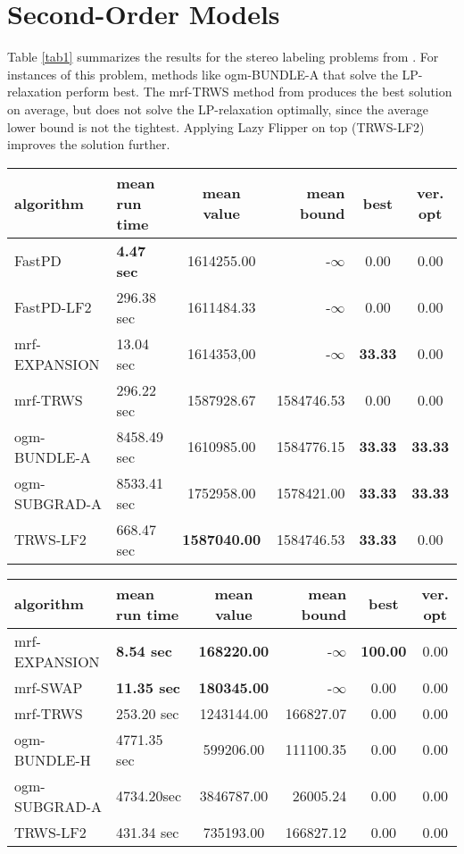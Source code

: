 \documentclass[10pt,twocolumn,letterpaper]{article}
\begin{document}
\section{Second-Order Models}

Table \ref{tab1} summarizes the results for the stereo labeling problems from \cite{comparative}. For instances of this problem, methods like ogm-BUNDLE-A that solve the LP-relaxation perform best. The mrf-TRWS method from \cite{comparative} produces the best solution on average, but does not solve the LP-relaxation optimally, since the average lower bound is not the tightest. Applying Lazy Flipper on top (TRWS-LF2) improves the solution further.

\begin{table*}
\begin{center}
\begin{tabular}{p{3.5cm}p{3cm}crcc}
 \hline
 algorithm & mean run time & mean value & mean bound & best & ver. opt \\ 
 \hline
 FastPD & {\bf 4.47 sec} & 1614255.00 & -$\infty$ & 0.00 & 0.00 \\ 
 FastPD-LF2 & 296.38 sec & 1611484.33 & -$\infty$ & 0.00 & 0.00 \\
 mrf-EXPANSION & 13.04 sec & 1614353,00 & -$\infty$ & {\bf 33.33} & 0.00 \\
 mrf-TRWS & 296.22 sec & 1587928.67 & 1584746.53 & 0.00 & 0.00 \\
 ogm-BUNDLE-A & 8458.49 sec & 1610985.00 & 1584776.15 & {\bf 33.33} & {\bf 33.33} \\
 ogm-SUBGRAD-A & 8533.41 sec & 1752958.00 & 1578421.00 & {\bf 33.33} & {\bf 33.33} \\
 TRWS-LF2 & 668.47 sec & {\bf 1587040.00} & 1584746.53 & {\bf 33.33} & 0.00 \\
 \hline
\end{tabular}
\end{center}
\caption{mrf-stereo (3 instances)}
\label{tab1}
\end{table*}
\begin{table*}
\begin{center}
\begin{tabular}{p{3.5cm}p{3cm}crcc}
  \hline
  algorithm & mean run time & mean value & mean bound & best & ver. opt \\ 
  \hline
  mrf-EXPANSION & {\bf 8.54 sec} & {\bf 168220.00} & -$\infty$ & {\bf 100.00} & 0.00 \\
  mrf-SWAP & {\bf 11.35 sec} & {\bf 180345.00} & -$\infty$ & 0.00 & 0.00 \\ 
  mrf-TRWS & 253.20 sec & 1243144.00 & 166827.07 & 0.00 & 0.00 \\ 
  ogm-BUNDLE-H & 4771.35 sec & 599206.00 & 111100.35 & 0.00 & 0.00 \\
  ogm-SUBGRAD-A & 4734.20sec & 3846787.00 & 26005.24 & 0.00 & 0.00 \\
  TRWS-LF2 & 431.34 sec & 735193.00 & 166827.12 & 0.00 & 0.00 \\ 
  \hline
\end{tabular}
\end{center}
\caption{mrf-photomontage (2 instances)}
\label{tab2}
\end{table*}
\end{document}
